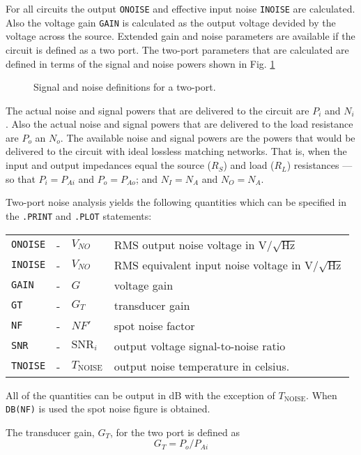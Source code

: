 For all circuits the output {\tt ONOISE} and effective input noise
{\tt INOISE} are calculated. Also the voltage gain {\tt GAIN} is calculated
as the output voltage devided by the voltage across the source.
Extended gain and noise parameters are available if the circuit is defined
as a two port.  The two-port parameters that are calculated are defined in
terms of the signal and noise powers shown in Fig. 
\ref{fig:signal:noise:two:port}
\begin{figure}
\centerline{\epsfxsize=5.5in}
\caption{Signal and noise definitions for a two-port.
\label{fig:signal:noise:two:port}}
\end{figure}
The actual noise and signal powers that are delivered to the circuit are
$P_i$ and $N_i$.
Also the actual noise and signal powers that are delivered to the load
resistance are $P_o$ an $N_o$.
The available noise and signal powers are the powers that would be
delivered to the circuit with ideal lossless matching networks.
That is, when the input and output impedances equal the source ($R_S$) and
load ($R_L$) resistances --- so that
$P_i = P_{Ai}$ and $P_o = P_{Ao}$; and
$N_I = N_A$ and $N_O = N_A$.

Two-port noise analysis yields the following quantities which can be
specified in the {\tt .PRINT} and {\tt .PLOT} statements:\\
      \offset\begin{tabular}{lclp{3.5in}}
      {\tt ONOISE} &-&$V_{NO}$&RMS output noise voltage in
                          V/$\sqrt{\mbox{Hz}}$\\
      {\tt INOISE} &-&$V_{NO}$&RMS equivalent input noise voltage in
                          V/$\sqrt{\mbox{Hz}}$\\
      {\tt GAIN} &-&$G$&voltage gain\\
      {\tt GT} &-&$G_T$&transducer gain\\
      {\tt NF} &-&$NF'$&spot noise factor\\
      {\tt SNR} &-&$\mbox{SNR}_i$&output voltage signal-to-noise ratio\\
      {\tt TNOISE} &-&$T_{\mbox{NOISE}}$&output noise temperature in celsius.
      \end{tabular}

All of the quantities can be output in dB with the exception of
$T_{\mbox{NOISE}}$.
When {\tt DB(NF)} is used the spot noise figure is obtained.

The transducer gain, $G_T$, for the two port is
defined as
\begin{equation}
G_T = P_o / P_{Ai}
\end{equation}


